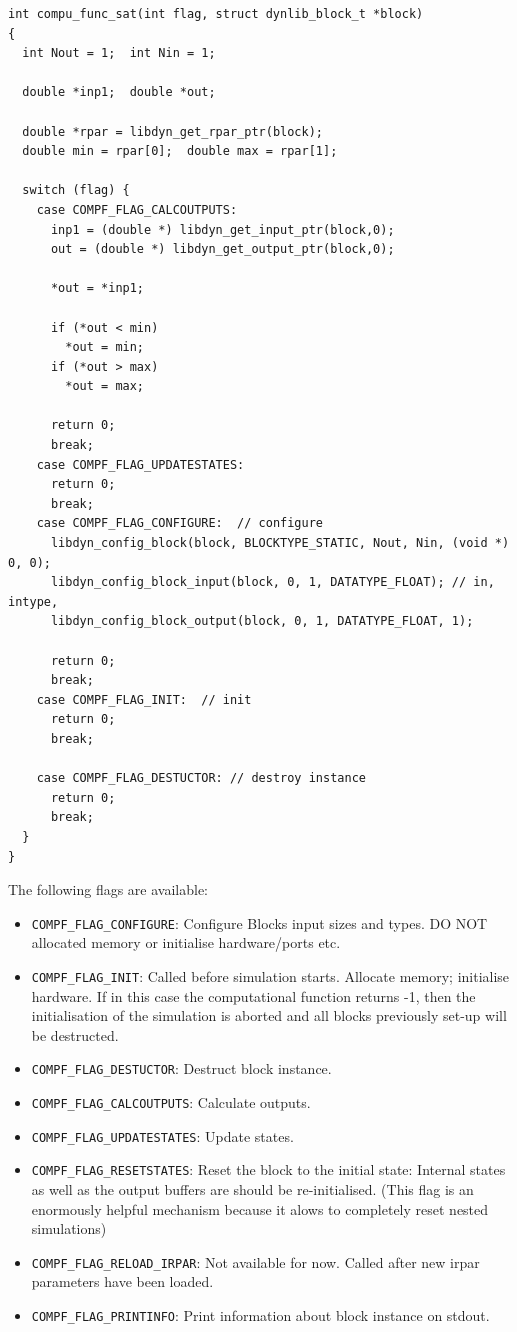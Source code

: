 \documentclass[%
	pdftex,%
	a4paper,%
	oneside,%
	11pt,%
	halfparskip,%
	headsepline,%
	bibtotocnumbered,%
	idxtotoc%
]{scrartcl}
\begin{document}
\begin{verbatim}
int compu_func_sat(int flag, struct dynlib_block_t *block)
{
  int Nout = 1;  int Nin = 1;

  double *inp1;  double *out;	

  double *rpar = libdyn_get_rpar_ptr(block);
  double min = rpar[0];  double max = rpar[1];

  switch (flag) {
    case COMPF_FLAG_CALCOUTPUTS:
      inp1 = (double *) libdyn_get_input_ptr(block,0);
      out = (double *) libdyn_get_output_ptr(block,0);
      
      *out = *inp1;
      
      if (*out < min)
        *out = min;
      if (*out > max)
        *out = max;
      
      return 0;
      break;
    case COMPF_FLAG_UPDATESTATES:
      return 0;
      break;
    case COMPF_FLAG_CONFIGURE:  // configure
      libdyn_config_block(block, BLOCKTYPE_STATIC, Nout, Nin, (void *) 0, 0); 
      libdyn_config_block_input(block, 0, 1, DATATYPE_FLOAT); // in, intype, 
      libdyn_config_block_output(block, 0, 1, DATATYPE_FLOAT, 1);

      return 0;
      break;
    case COMPF_FLAG_INIT:  // init
      return 0;
      break;

    case COMPF_FLAG_DESTUCTOR: // destroy instance
      return 0;
      break;
  }
}
\end{verbatim}


The following flags are available:

\begin{itemize}
 \item \texttt{COMPF\_FLAG\_CONFIGURE}: Configure Blocks input sizes and types. DO NOT allocated memory or initialise hardware/ports etc.
 \item \texttt{COMPF\_FLAG\_INIT}: Called before simulation starts. Allocate memory; initialise hardware. If in this case the computational function returns -1, then the initialisation of the simulation is aborted and all blocks previously set-up will be destructed.
 \item \texttt{COMPF\_FLAG\_DESTUCTOR}: Destruct block instance.
 \item \texttt{COMPF\_FLAG\_CALCOUTPUTS}: Calculate outputs.
 \item \texttt{COMPF\_FLAG\_UPDATESTATES}: Update states.
 \item \texttt{COMPF\_FLAG\_RESETSTATES}: Reset the block to the initial state: Internal states as well as the output buffers are should be re-initialised. (This flag is an enormously helpful mechanism because it alows to completely reset nested simulations)
 \item \texttt{COMPF\_FLAG\_RELOAD\_IRPAR}: Not available for now. Called after new irpar parameters have been loaded.
 \item \texttt{COMPF\_FLAG\_PRINTINFO}: Print information about block instance on stdout.
\end{itemize}
\end{document}
